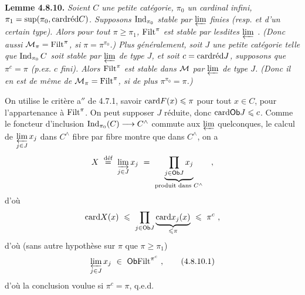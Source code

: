 
\textbf{Lemme 4.8.10.} \textit{Soient $C$ une petite catégorie, $\pi_0$ un cardinal infini, $\pi_1 = \sup(\pi_0, \card\red C)$. Supposons $\Ind_{\pi_0}$ stable par $\varprojlim$ finies (resp. et d'un certain type). Alors pour tout $\pi \geqslant \pi_1$, $\Filt^{\pi}$ est stable par lesdites $\varprojlim$ . (Donc aussi $\cM_{\pi} = \Filt^{\pi}$, si $\pi = \pi^{\pi_0}$.) Plus} %
\textit{généralement, soit $J$ une petite catégorie telle que $\Ind_{\pi_0}C$ soit stable par $\varprojlim$ de type $J$, et soit $c = \card\red J$, supposons que $\pi^{c} = \pi$ (p.ex. $c$ fini). Alors $\Filt^{\pi}$ est stable dans $\cM$ par $\varprojlim$ de type $J$. (Donc il en est de même de $\cM_{\pi} = \Filt^{\pi}$, si de plus $\pi^{\pi_0} = \pi$.)}

On utilise le critère a$''$ de 4.7.1, savoir $\card F(x) \leqslant \pi$ pour tout $x \in C$, pour l'appartenance à $\Filt^{\pi}$. On peut supposer $J$ réduite, donc $\card\Ob J \leqslant c$. Comme le foncteur d'inclusion $\Ind_{\pi_0}(C) \longrightarrow C^{\wedge}$ commute aux $\varprojlim$ quelconques, le calcul de $\varprojlim\limits_{j\in J} x_j$ dans $C^{\wedge}$ fibre par fibre montre que dans $C^{\wedge}$, on a
\[
X \ \defeq\ \varinjlim_{j\in J} x_j \ = \ \underbrace{\prod_{j\in\Ob J} x_j}_{\text{produit dans } C^{\wedge}} \quad ,
\] %
d'où
\[
\card X(x) \ \leqslant\ \prod_{j\in\Ob J} \underbrace{\card x_j(x)}_{\leqslant\pi} \ \leqslant\ \pi^{c}\ ,
\]
d'où (sans autre hypothèse sur $\pi$ que $\pi \geqslant \pi_1$)
\[
\varprojlim_{j\in J} x_j \ \in\ \Ob\Filt^{\pi^{c}}\ , \tag*{(4.8.10.1)}
\]
d'où la conclusion voulue si $\pi^{c} = \pi$, q.e.d.


